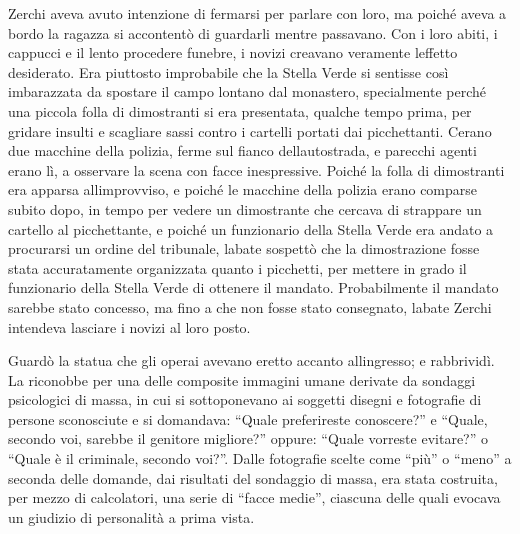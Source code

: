 Zerchi aveva avuto intenzione di fermarsi per parlare con loro, ma
poiché aveva a bordo la ragazza si accontentò di guardarli mentre
passavano. Con i loro abiti, i cappucci e il lento procedere funebre, i
novizi creavano veramente l\textquotesingle effetto desiderato. Era
piuttosto improbabile che la Stella Verde si sentisse così imbarazzata
da spostare il campo lontano dal monastero, specialmente perché una
piccola folla di dimostranti si era presentata, qualche tempo prima, per
gridare insulti e scagliare sassi contro i cartelli portati dai
picchettanti. C\textquotesingle erano due macchine della polizia, ferme
sul fianco dell\textquotesingle autostrada, e parecchi agenti erano lì,
a osservare la scena con facce inespressive. Poiché la folla di
dimostranti era apparsa all\textquotesingle improvviso, e poiché le
macchine della polizia erano comparse subito dopo, in tempo per vedere
un dimostrante che cercava di strappare un cartello al picchettante, e
poiché un funzionario della Stella Verde era andato a procurarsi un
ordine del tribunale, l\textquotesingle abate sospettò che la
dimostrazione fosse stata accuratamente organizzata quanto i picchetti,
per mettere in grado il funzionario della Stella Verde di ottenere il
mandato. Probabilmente il mandato sarebbe stato concesso, ma fino a che
non fosse stato consegnato, l\textquotesingle abate Zerchi intendeva
lasciare i novizi al loro posto.

Guardò la statua che gli operai avevano eretto accanto
all\textquotesingle ingresso; e rabbrividì. La riconobbe per una delle
composite immagini umane derivate da sondaggi psicologici di massa, in
cui si sottoponevano ai soggetti disegni e fotografie di persone
sconosciute e si domandava: ``Quale preferireste conoscere?'' e ``Quale,
secondo voi, sarebbe il genitore migliore?'' oppure: ``Quale vorreste
evitare?'' o ``Quale è il criminale, secondo voi?''. Dalle fotografie
scelte come ``più'' o ``meno'' a seconda delle domande, dai risultati
del sondaggio di massa, era stata costruita, per mezzo di calcolatori,
una serie di ``facce medie'', ciascuna delle quali evocava un giudizio
di personalità a prima vista.


